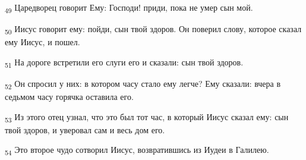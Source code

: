 \begin{tcolorbox}
\textsubscript{49} Царедворец говорит Ему: Господи! приди, пока не умер сын мой.
\end{tcolorbox}
\begin{tcolorbox}
\textsubscript{50} Иисус говорит ему: пойди, сын твой здоров. Он поверил слову, которое сказал ему Иисус, и пошел.
\end{tcolorbox}
\begin{tcolorbox}
\textsubscript{51} На дороге встретили его слуги его и сказали: сын твой здоров.
\end{tcolorbox}
\begin{tcolorbox}
\textsubscript{52} Он спросил у них: в котором часу стало ему легче? Ему сказали: вчера в седьмом часу горячка оставила его.
\end{tcolorbox}
\begin{tcolorbox}
\textsubscript{53} Из этого отец узнал, что это был тот час, в который Иисус сказал ему: сын твой здоров, и уверовал сам и весь дом его.
\end{tcolorbox}
\begin{tcolorbox}
\textsubscript{54} Это второе чудо сотворил Иисус, возвратившись из Иудеи в Галилею.
\end{tcolorbox}
